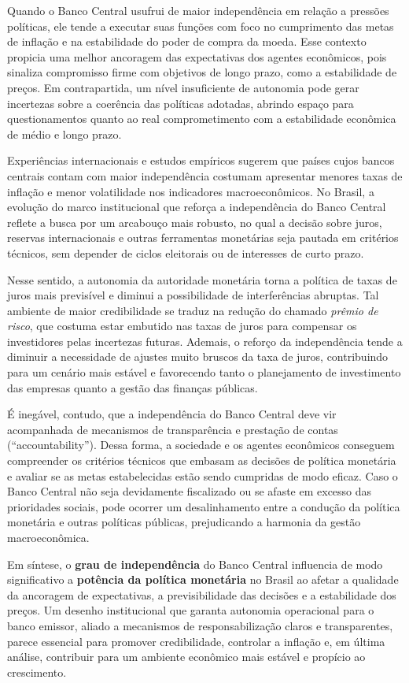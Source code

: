 \documentclass[a4paper,12pt]{article}[abnt2]
\begin{document}
Quando o Banco Central usufrui de maior independência em relação a pressões políticas, ele tende a executar suas funções com foco no cumprimento das metas de inflação e na estabilidade do poder de compra da moeda. Esse contexto propicia uma melhor ancoragem das expectativas dos agentes econômicos, pois sinaliza compromisso firme com objetivos de longo prazo, como a estabilidade de preços. Em contrapartida, um nível insuficiente de autonomia pode gerar incertezas sobre a coerência das políticas adotadas, abrindo espaço para questionamentos quanto ao real comprometimento com a estabilidade econômica de médio e longo prazo.

Experiências internacionais e estudos empíricos sugerem que países cujos bancos centrais contam com maior independência costumam apresentar menores taxas de inflação e menor volatilidade nos indicadores macroeconômicos. No Brasil, a evolução do marco institucional que reforça a independência do Banco Central reflete a busca por um arcabouço mais robusto, no qual a decisão sobre juros, reservas internacionais e outras ferramentas monetárias seja pautada em critérios técnicos, sem depender de ciclos eleitorais ou de interesses de curto prazo.

Nesse sentido, a autonomia da autoridade monetária torna a política de taxas de juros mais previsível e diminui a possibilidade de interferências abruptas. Tal ambiente de maior credibilidade se traduz na redução do chamado \emph{prêmio de risco}, que costuma estar embutido nas taxas de juros para compensar os investidores pelas incertezas futuras. Ademais, o reforço da independência tende a diminuir a necessidade de ajustes muito bruscos da taxa de juros, contribuindo para um cenário mais estável e favorecendo tanto o planejamento de investimento das empresas quanto a gestão das finanças públicas.

É inegável, contudo, que a independência do Banco Central deve vir acompanhada de mecanismos de transparência e prestação de contas (``accountability''). Dessa forma, a sociedade e os agentes econômicos conseguem compreender os critérios técnicos que embasam as decisões de política monetária e avaliar se as metas estabelecidas estão sendo cumpridas de modo eficaz. Caso o Banco Central não seja devidamente fiscalizado ou se afaste em excesso das prioridades sociais, pode ocorrer um desalinhamento entre a condução da política monetária e outras políticas públicas, prejudicando a harmonia da gestão macroeconômica. 

Em síntese, o \textbf{grau de independência} do Banco Central influencia de modo significativo a \textbf{potência da política monetária} no Brasil ao afetar a qualidade da ancoragem de expectativas, a previsibilidade das decisões e a estabilidade dos preços. Um desenho institucional que garanta autonomia operacional para o banco emissor, aliado a mecanismos de responsabilização claros e transparentes, parece essencial para promover credibilidade, controlar a inflação e, em última análise, contribuir para um ambiente econômico mais estável e propício ao crescimento.
\end{document}
